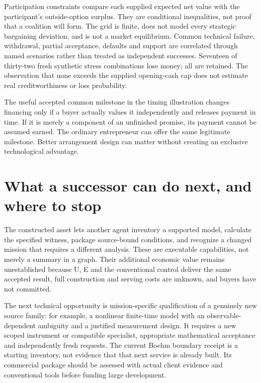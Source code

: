 

Participation constraints compare each supplied expected net value with the participant's outside-option surplus. They are conditional inequalities, not proof that a coalition will form. The grid is finite, does not model every strategic bargaining deviation, and is not a market equilibrium. Common technical failure, withdrawal, partial acceptance, defaults and support are correlated through named scenarios rather than treated as independent successes. Seventeen of thirty-two fresh synthetic stress combinations lose money; all are retained. The observation that none exceeds the supplied opening-cash cap does not estimate real creditworthiness or loss probability.

The useful accepted common milestone in the timing illustration changes financing only if a buyer actually values it independently and releases payment in time. If it is merely a component of an unfinished promise, its payment cannot be assumed earned. The ordinary entrepreneur can offer the same legitimate milestone. Better arrangement design can matter without creating an exclusive technological advantage.

\section{What a successor can do next, and where to stop}


The constructed asset lets another agent inventory a supported model, calculate the specified witness, package source-bound conditions, and recognize a changed mission that requires a different analysis. These are executable capabilities, not merely a summary in a graph. Their additional economic value remains unestablished because U, E and the conventional control deliver the same accepted result, full construction and serving costs are unknown, and buyers have not committed.

The next technical opportunity is mission-specific qualification of a genuinely new source family: for example, a nonlinear finite-time model with an observable-dependent ambiguity and a justified measurement design. It requires a new scoped instrument or compatible specialist, appropriate mathematical acceptance and independently fresh requests. The current Boehm boundary receipt is a starting inventory, not evidence that that next service is already built. Its commercial package should be assessed with actual client evidence and conventional tools before funding large development.


